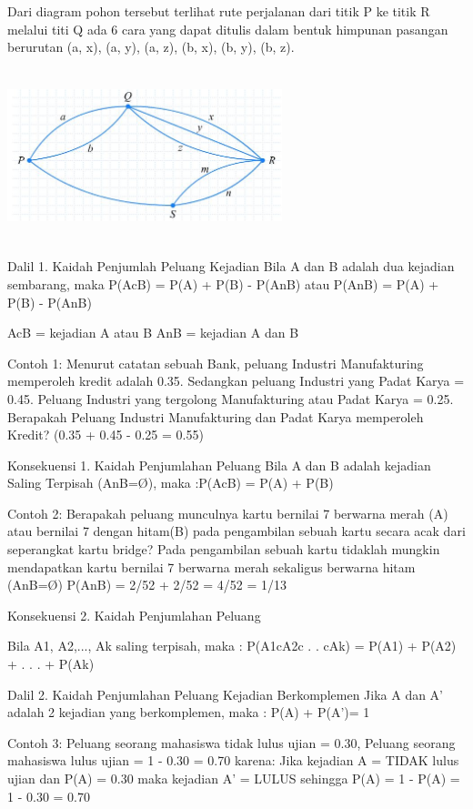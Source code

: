 \documentclass[11pt,fleqn]{book} %
\begin{document}
 Dari diagram pohon tersebut terlihat rute perjalanan dari titik P ke titik R melalui titi Q ada 6 cara yang dapat ditulis dalam bentuk himpunan pasangan berurutan {(a, x), (a, y), (a, z), (b, x), (b, y), (b, z)}. 

 
 \includegraphics[width = 8cm, height= 5cm]{Pictures/contoh3b.JPG}
 
Dalil 1. Kaidah Penjumlah Peluang Kejadian
Bila A dan B adalah dua kejadian sembarang, maka
P(AcB) = P(A) + P(B) - P(AnB)
atau
P(AnB) = P(A) + P(B) - P(AnB)

AcB = kejadian A atau B                        AnB = kejadian A dan B

 Contoh 1:
Menurut catatan sebuah Bank, peluang Industri Manufakturing memperoleh kredit adalah
0.35. Sedangkan peluang Industri yang Padat Karya = 0.45. Peluang Industri yang
tergolong Manufakturing atau Padat Karya = 0.25. Berapakah Peluang Industri
Manufakturing dan Padat Karya memperoleh Kredit? (0.35 + 0.45 - 0.25 = 0.55)

Konsekuensi 1. Kaidah Penjumlahan Peluang
Bila A dan B adalah kejadian Saling Terpisah (AnB=Ø), maka :P(AcB) = P(A) + P(B)

Contoh 2:
Berapakah peluang munculnya kartu bernilai 7 berwarna merah (A) atau bernilai 7 dengan
hitam(B) pada pengambilan sebuah kartu secara acak dari seperangkat kartu bridge?
Pada pengambilan sebuah kartu tidaklah mungkin mendapatkan kartu bernilai 7 berwarna
merah sekaligus berwarna hitam (AnB=Ø)
P(AnB) = 2/52 + 2/52 = 4/52 = 1/13

Konsekuensi 2. Kaidah Penjumlahan Peluang

Bila A1, A2,..., Ak saling terpisah, maka :
P(A1cA2c . . cAk) = P(A1) + P(A2) + . . . + P(Ak)

Dalil 2. Kaidah Penjumlahan Peluang Kejadian Berkomplemen
Jika A dan A' adalah 2 kejadian yang berkomplemen, maka :
P(A) + P(A')= 1

Contoh 3:
Peluang seorang mahasiswa tidak lulus ujian = 0.30, Peluang seorang mahasiswa lulus
ujian = 1 - 0.30 = 0.70
karena:
Jika kejadian A = TIDAK lulus ujian dan P(A) = 0.30
maka kejadian A’ = LULUS sehingga P(A) = 1 - P(A) = 1 - 0.30 = 0.70
 
\end{document}
